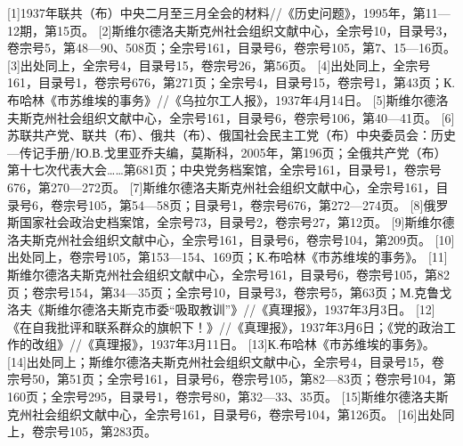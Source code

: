 [1]1937年联共（布）中央二月至三月全会的材料//《历史问题》，1995年，第11—12期，第15页。
[2]斯维尔德洛夫斯克州社会组织文献中心，全宗号10，目录号3，卷宗号5，第48—90、508页；全宗号161，目录号6，卷宗号105，第7、15—16页。
[3]出处同上，全宗号4，目录号15，卷宗号26，第56页。
[4]出处同上，全宗号161，目录号1，卷宗号676，第271页；全宗号4，目录号15，卷宗号1，第43页；К.布哈林《市苏维埃的事务》//《乌拉尔工人报》，1937年4月14日。
[5]斯维尔德洛夫斯克州社会组织文献中心，全宗号161，目录号6，卷宗号106，第40—41页。
[6]苏联共产党、联共（布）、俄共（布）、俄国社会民主工党（布）中央委员会：历史—传记手册/Ю.В.戈里亚乔夫编，莫斯科，2005年，第196页；全俄共产党（布）第十七次代表大会……第681页；中央党务档案馆，全宗号161，目录号1，卷宗号676，第270—272页。
[7]斯维尔德洛夫斯克州社会组织文献中心，全宗号161，目录号6，卷宗号105，第54—58页；目录号1，卷宗号676，第272—274页。
[8]俄罗斯国家社会政治史档案馆，全宗号73，目录号2，卷宗号27，第12页。
[9]斯维尔德洛夫斯克州社会组织文献中心，全宗号161，目录号6，卷宗号104，第209页。
[10]出处同上，卷宗号105，第153—154、169页；К.布哈林《市苏维埃的事务》。
[11]斯维尔德洛夫斯克州社会组织文献中心，全宗号161，目录号6，卷宗号105，第82页；卷宗号154，第34—35页；全宗号10，目录号3，卷宗号5，第63页；М.克鲁戈洛夫《斯维尔德洛夫斯克市委“吸取教训”》//《真理报》，1937年3月3日。
[12]《在自我批评和联系群众的旗帜下！》//《真理报》，1937年3月6日；《党的政治工作的改组》//《真理报》，1937年3月11日。
[13]К.布哈林《市苏维埃的事务》。
[14]出处同上；斯维尔德洛夫斯克州社会组织文献中心，全宗号4，目录号15，卷宗号50，第51页；全宗号161，目录号6，卷宗号105，第82—83页；卷宗号104，第160页；全宗号295，目录号1，卷宗号80，第32—33、35页。
[15]斯维尔德洛夫斯克州社会组织文献中心，全宗号161，目录号6，卷宗号104，第126页。
[16]出处同上，卷宗号105，第283页。
